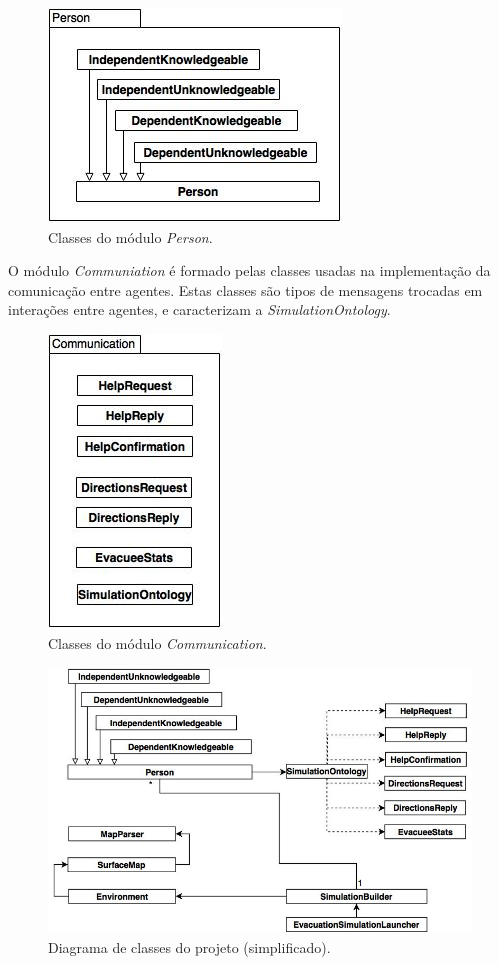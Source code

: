 \documentclass[12pt]{article}
\begin{document}
\begin{titlepage}
\begin{figure}[H]
	\centering
	\includegraphics[scale=0.8]{person.jpg}
	\caption{Classes do módulo \textit{Person}.}
	\label{uml}
\end{figure}
\newpage
O módulo \textit{Communiation} é formado pelas classes usadas na implementação da comunicação entre agentes. Estas classes são tipos de mensagens trocadas em interações entre agentes, e caracterizam a \textit{SimulationOntology}.

\begin{figure}[H]
	\centering
	\includegraphics[scale=0.7]{communication.jpg}
	\caption{Classes do módulo \textit{Communication}.}
	\label{uml}
\end{figure}

\begin{figure}[H]
	\centering
	\includegraphics[scale=0.5]{classes.jpg}
	\caption{Diagrama de classes do projeto (simplificado).}
	\label{uml}
\end{figure}



\end{titlepage}
\end{document}
